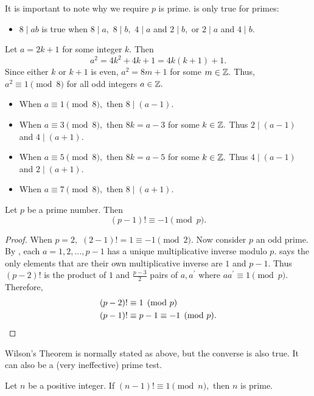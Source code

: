 \documentclass{ximera}
\begin{document}
\begin{remark}
    It is important to note why we require $p$ is prime.  is only true for primes: 
    \begin{itemize}
        \item $8\mid ab$ is true when $8\mid a,$ $8\mid b,$ $4\mid a$ and $2\mid b,$ or $2\mid a$ and $4\mid b.$
    \end{itemize}
    Let $a=2k+1$ for some integer $k.$ Then 
    \[a^2=4k^2+4k+1=4k(k+1)+1.\]
    Since either $k$ or $k+1$ is even, $a^2=8m+1$ for some $m\in\mathbb Z.$ Thus, $a^2\equiv 1\pmod 8$ for all odd integers $a\in\mathbb Z.$

    \begin{itemize}
        \item When $a\equiv 1\pmod 8,$ then $8\mid (a-1).$
        \item When $a\equiv 3\pmod 8,$ then $8k=a-3$ for some $k\in\mathbb Z.$ Thus $2\mid (a-1)$ and $4\mid (a+1)$.
        \item When $a\equiv 5\pmod 8,$ then $8k=a-5$ for some $k\in\mathbb Z.$ Thus $4\mid (a-1)$ and $2\mid (a+1)$.
        \item When $a\equiv 7\pmod 8,$ then $8\mid (a+1).$
    \end{itemize}
\end{remark}


\begin{theorem}\label{Wilson}
    Let $p$ be a prime number. Then \[(p-1)!\equiv -1\pmod{p}.\]
\end{theorem}

\begin{proof}
    When $p=2,$ $(2-1)!=1\equiv -1 \pmod{2}.$ Now consider $p$ an odd prime. By , each $a=1,2,\dots,p-1$ has a unique multiplicative inverse modulo $p.$  says the only elements that are their own multiplicative inverse are $1$ and $p-1$. Thus $(p-2)!$ is the product of $1$ and $\frac{p-3}{2}$ pairs of $a,a^\prime$ where $a a^\prime\equiv 1\pmod{p}.$ Therefore, 
    \begin{align*}
        (p-2)! & \equiv 1\pmod{p}\\
        (p-1)! & \equiv p-1\equiv -1 \pmod{p}.\qedhere
    \end{align*}
\end{proof}

Wilson's Theorem is normally stated as above, but the converse is also true. It can also be a (very ineffective) prime test.
\begin{proposition}\label{Wilson-converse}
    Let $n$ be a positive integer. If $(n-1)!\equiv 1\pmod{n},$ then $n$ is prime.
\end{proposition}
\end{document}
